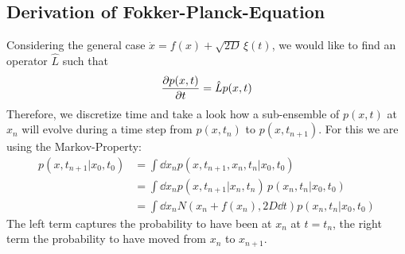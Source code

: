 \documentclass{notebook}
\begin{document}
\subsection*{Derivation of Fokker-Planck-Equation}


Considering the general case $\dot{x} = f(x) + \sqrt{2D} \, \xi(t)$, we would like to find an operator $\hat{L}$ such that
%
\begin{equation}
\pdv{p(x,t)}{t} = \hat{L} p(x,t)
\end{equation}
%
Therefore, we discretize time and take a look how a sub-ensemble of $p(x,t)$ at $x_n$ will evolve during a time step from $p(x,t_n)$ to $p(x,t_{n+1})$. For this we are using the Markov-Property: 
%
\begin{align*}
	p(x,t_{n+1}|x_0,t_0) &= \int{\dd{x}_n p(x,t_{n+1},x_n,t_n|x_0,t_0)} \\
	&= \int{\dd{x}_n p(x,t_{n+1}|x_n,t_n)} \, p(x_n,t_n|x_0,t_0) \\
	&= \int{\dd{x}_n N(x_n+f(x_n), 2D \dd{t}) p(x_n,t_n|x_0,t_0)}
\end{align*}
%
The left term captures the probability to have been at $x_n$ at $t = t_n$, the right term the probability to have moved from $x_n$ to $x_{n+1}$.
\end{document}
